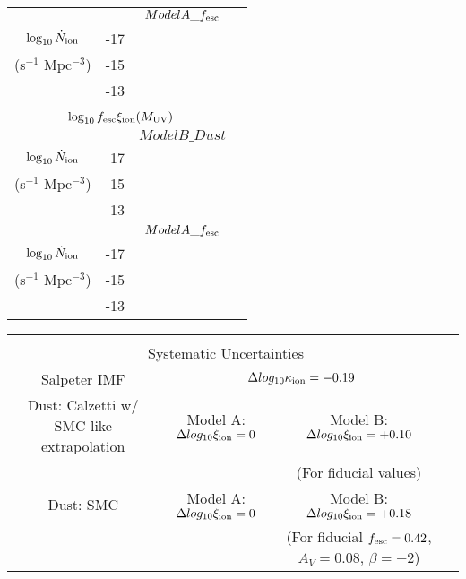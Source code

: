 \begin{table}
\begin{tabular}{cc|cccccc}
	  & & \multicolumn{5}{c}{$ModelA\_f_{\rm{esc}}$}\\
	  
$\log_{10} \dot{N}_{\rm{ion}}$	 		& -17 &  \\
(s$^{-1}$ Mpc$^{-3}$) 				& -15 &  \\
												& -13 &  \\											

	 \multicolumn{7}{c}{}\\
	 \multicolumn{7}{c}{$\log_{10}f_{\rm{esc}}\xi_{\rm{ion}}(M_{\rm{UV}})$}\\\hline
	 
	  & & \multicolumn{5}{c}{$ModelB\_Dust$}\\
	  
$\log_{10} \dot{N}_{\rm{ion}}$	 		& -17 &  \\
(s$^{-1}$ Mpc$^{-3}$) 				& -15 &  \\
												& -13 &  \\
												
	  & & \multicolumn{5}{c}{$ModelA\_f_{\rm{esc}}$}\\
	  
$\log_{10} \dot{N}_{\rm{ion}}$	 		& -17 &  \\
(s$^{-1}$ Mpc$^{-3}$) 				& -15 &  \\
												& -13 &  \\		

\end{tabular}
 \begin{tabular}{cc|cccccc}
	 \multicolumn{7}{c}{}\\
	 \multicolumn{7}{c}{Systematic Uncertainties}\\\hline
	 \multicolumn{2}{c}{Salpeter IMF} & \multicolumn{5}{c}{$\Delta log_{10}\kappa_{\rm{ion}} = -0.19$}\\

	 \multicolumn{2}{c}{Dust: Calzetti w/ SMC-like extrapolation} &  \multicolumn{2}{c}{Model A: $\Delta log_{10}\xi_{\rm{ion}} = 0$} & \multicolumn{3}{c}{Model B: $\Delta log_{10}\xi_{\rm{ion}} = +0.10$}\\
	 \multicolumn{2}{c}{} &  \multicolumn{2}{c}{} & \multicolumn{3}{c}{ (For fiducial values)}\\
 
	 	 \multicolumn{2}{c}{Dust: SMC \citep{Pei:1992ey}} &  \multicolumn{2}{c}{Model A: $\Delta log_{10}\xi_{\rm{ion}} = 0$} & \multicolumn{3}{c}{Model B: $\Delta log_{10}\xi_{\rm{ion}} = +0.18$} \\
	 	 \multicolumn{2}{c}{} &  \multicolumn{2}{c}{} & \multicolumn{3}{c}{(For fiducial $f_{\rm{esc}} = 0.42$, $A_{V} = 0.08$, $\beta = -2$)}


  \end{tabular} \label{tab:bouwens_N}
\end{table}

